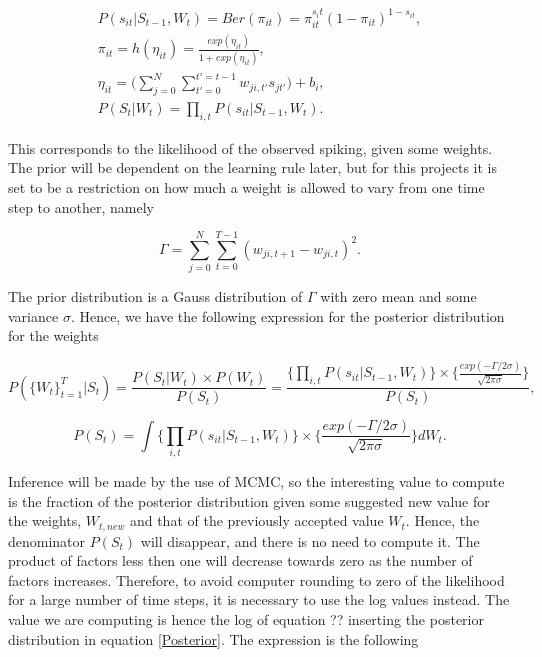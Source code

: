 \begin{equation}
\begin{split}
    P(s_{it}|S_{t-1}, W_t) =  Ber(\pi_{it}) = \pi_{it}^{s_it}(1-\pi_{it})^{1-s_{it}}, \\ \pi_{it} = h(\eta_{it})= \frac{exp(\eta_{it})}{1+exp(\eta_{it})},\\
    \eta_{it} = \Big (\sum_{j=0}^{N}\sum_{t'=0}^{t'=t-1} w_{ji,t'}s_{jt'} \Big) + b_i, \\
    P(S_t|W_t) = \prod_{i,t} P(s_{it}|S_{t-1}, W_t).
\end{split}
\end{equation}

This corresponds to the likelihood of the observed spiking, given some weights. The prior will be dependent on the learning rule later, but for this projects it is set to be a restriction on how much a weight is allowed to vary from one time step to another, namely

\begin{equation}
    \Gamma = \sum_{j=0}^{N} \sum_{t=0}^{T-1} (w_{ji,t+1}-w_{ji,t})^2.
\end{equation}

The prior distribution is a Gauss distribution of $\Gamma$ with zero mean and some variance $\sigma$. Hence, we have the following expression for the posterior distribution for the weights

\begin{equation}
\label{Posterior}
        P(\{W_t\}_{t=1}^{T}|S_t) = \frac{P(S_t|W_t)\times P(W_t)}{P(S_t)} = \frac{\Big\{\prod_{i,t} P(s_{it}|S_{t-1}, W_t)\Big\} \times \Big\{\frac{exp(-\Gamma /2\sigma)}{\sqrt{2\pi \sigma}}\Big\}}{P(S_t)}, 
\end{equation}

\begin{equation}
        P(S_t) = \int \Big\{\prod_{i,t} P(s_{it}|S_{t-1}, W_t)\Big\} \times \Big\{\frac{exp(-\Gamma /2\sigma)}{\sqrt{2\pi \sigma}}\Big\} d{W_t}.
\end{equation}

Inference will be made by the use of MCMC, so the interesting value to compute is the fraction of the posterior distribution given some suggested new value for the weights, $W_{t, new}$ and that of the previously accepted value $W_t$. Hence, the denominator $P(S_t)$ will disappear, and there is no need to compute it. The product of factors less then one will decrease towards zero as the number of factors increases. Therefore, to avoid computer rounding to zero of the likelihood for a large number of time steps, it is necessary to use the log values instead. The value we are computing is hence the log of equation ??  inserting the posterior distribution in equation \ref{Posterior}. The expression is the following

